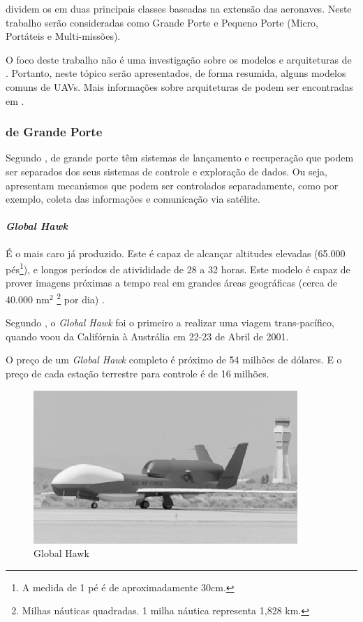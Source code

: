 \cite{Drew2005} dividem os \vants em duas principais classes baseadas na extensão das aeronaves. Neste trabalho serão consideradas como Grande Porte e Pequeno Porte (Micro, Portáteis e Multi-missões).

O foco deste trabalho não é uma investigação sobre os modelos e arquiteturas de \vants. Portanto,  neste tópico serão apresentados, de forma resumida, alguns modelos comuns de UAVs. Mais informações sobre arquiteturas de \vants podem ser encontradas em \cite{Drew2005,uav_roadmap2005, Bone2003,Holder2001}.

\addtocounter{footnote}{1}

\subsubsection{\vants de Grande Porte}
Segundo \cite{Drew2005}, \vants de grande porte têm sistemas de lançamento e recuperação que podem ser separados dos seus sistemas de controle e exploração de dados. Ou seja, apresentam mecanismos que podem ser controlados separadamente, como por exemplo, coleta das informações e comunicação via satélite.



 \paragraph{\emph{Global Hawk} }

 É o \vant mais caro já produzido. Este \vant é capaz de alcançar altitudes elevadas (65.000 pés\footnote{A medida de 1 pé é de aproximadamente 30cm.}), e longos períodos de ativididade de 28 a 32 horas. Este modelo é capaz de prover imagens próximas a tempo real em grandes áreas geográficas (cerca de 40.000 nm$^{2}$ \footnote{Milhas náuticas quadradas. 1 milha náutica representa 1,828 km.} por dia) \cite{uav_roadmap2005}.

Segundo \cite{Drew2005}, o \emph{Global Hawk} foi o primeiro \vant a realizar uma viagem trans-pacífico, quando voou da Califórnia à Austrália em 22-23 de Abril de 2001.

O preço de um \emph{Global Hawk} completo é próximo de 54 milhões de dólares. E o preço de cada estação terrestre para controle
é de 16 milhões.

\begin{figure}[h!]
\centering
\includegraphics[width=10cm]{pictures/global_hawk.png}
\caption{Global Hawk}
 \label{fig:global_hawk}
\end{figure}


